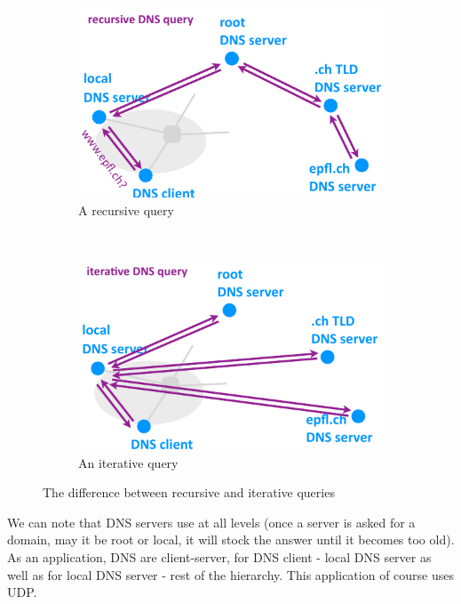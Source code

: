 \documentclass[12pt,a4paper]{article}
\begin{document}
\begin{figure}[h]
	\centering
	\begin{subfigure}[b]{0.45\textwidth}
		\includegraphics[scale=0.5]{images/recursive_DNS}
		\caption{A recursive query}
		\label{fig: recursive DNS}
	\end{subfigure}
	~
	\begin{subfigure}[b]{0.45\textwidth}
		\includegraphics[scale=0.5]{images/iterative_DNS}
		\caption{An iterative query}
		\label{fig: iterative DNS}
	\end{subfigure}
	\caption{The difference between recursive and iterative queries}
	\label{figs: DNS iterative + recursive}
\end{figure}

We can note that DNS servers use  at all levels (once a server is asked for a domain, may it be root or local, it will stock the answer until it becomes too old). As an application, DNS are client-server, for DNS client - local DNS server as well as for local DNS server - rest of the hierarchy. This application of course uses UDP.
\end{document}
